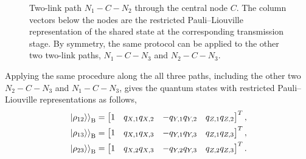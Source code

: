 \begin{figure}[tb]

    \caption{
        Two-link path \(N_1\!-\!C\!-\!N_2\) through the central node \(C\).
        The column vectors below the nodes are the restricted
        Pauli--Liouville representation of the shared state at the
        corresponding transmission stage.
        By symmetry, the same protocol can be applied to the other
        two two-link paths, \(N_1- C- N_3\) and
        \(N_2- C- N_3\).
    }
    \label{fig:two-link-path}
\end{figure}
Applying the same procedure along the all three paths, including the other two \(N_2 \!-\!C\!-\!N_3\) and \(N_1\!-\!C\!-\!N_3\), gives the quantum states with restricted Pauli--Liouville representations as follows,
\begin{equation}
    \begin{aligned}
        \left. \left|\rho_{12}\right\rangle \right \rangle_{\mathrm B}
         & =
        \begin{bmatrix}
            1               &
            q_{X,1}q_{X,2}  &
            -q_{Y,1}q_{Y,2} &
            q_{Z,1}q_{Z,2}
        \end{bmatrix}^{T}, \\
        \left. \left|\rho_{13}\right\rangle \right \rangle_{\mathrm B}
         & =
        \begin{bmatrix}
            1               &
            q_{X,1}q_{X,3}  &
            -q_{Y,1}q_{Y,3} &
            q_{Z,1}q_{Z,3}
        \end{bmatrix}^{T}, \\
        \left. \left|\rho_{23}\right\rangle \right \rangle_{\mathrm B}
         & =
        \begin{bmatrix}
            1               &
            q_{X,2}q_{X,3}  &
            -q_{Y,2}q_{Y,3} &
            q_{Z,2}q_{Z,3}
        \end{bmatrix}^{T}.
    \end{aligned}
    \label{eq:direct-two-link-states}
\end{equation}


